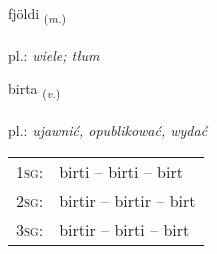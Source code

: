 \documentclass[frontgrid, backgrid]{flacards}\usepackage[]{graphicx}\usepackage[]{xcolor}
\begin{document}
\renewcommand{\blhead}{\vskip5pt {\small\bfseries\footnotesize Nafnorð | Noun }}
\renewcommand{\bcfoot}{\vskip5pt \hspace{2pt}{\small\bfseries\footnotesize 1K}}


{fjöldi \small{\textsubscript{(\textit{m.})}} \\[1ex] %
\textphonetic{[fjœltɪ]} \\
pl.: \emph{wiele; tłum} \\  [2ex]
\renewcommand*{\arraystretch}{0.8}
}

\renewcommand{\flhead}{\vskip5pt \fboxsep=0pt {\small\bfseries\footnotesize Sagnorð | Verb}}
\renewcommand{\fcfoot}{\vskip5pt \fboxsep=0pt \hspace{2pt}{\small\bfseries\footnotesize 1K}}

\renewcommand{\blhead}{\vskip5pt {\small\bfseries\footnotesize Sagnorð | Verb }}
\renewcommand{\bcfoot}{\vskip5pt \hspace{2pt}{\small\bfseries\footnotesize 1K}}


{birta \small{\textsubscript{(\textit{v.})}} \\[1ex] %
\textphonetic{[pɪr̥ta]} \\
pl.: \emph{ujawnić, opublikować, wydać} \\  [2ex]
\renewcommand*{\arraystretch}{0.8}
\begin{tabular}{p{1cm}l}
\textsc{1sg}: & birti -- birti -- birt \\ 
\textsc{2sg}: & birtir -- birtir -- birt \\ 
\textsc{3sg}: & birtir -- birti -- birt \\ 
\end{tabular}
}

\renewcommand{\flhead}{\vskip5pt \fboxsep=0pt {\small\bfseries\footnotesize Sagnorð | Verb}}
\renewcommand{\fcfoot}{\vskip5pt \fboxsep=0pt \hspace{2pt}{\small\bfseries\footnotesize 1K}}
\end{document}
